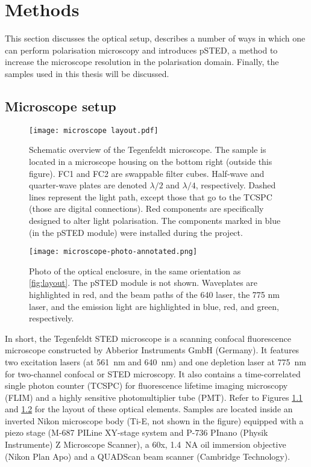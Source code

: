 \chapter{Methods}

This section discusses the optical setup, describes a number of ways in which one can perform polarisation microscopy and introduces pSTED, a method to increase the microscope resolution in the polarisation domain. Finally, the samples used in this thesis will be discussed.

\section{Microscope setup}

\begin{figure}[h!]
	\centering
	\texttt{[image: microscope layout.pdf]}
	\caption{
		Schematic overview of the Tegenfeldt microscope. The sample is located in a microscope housing on the bottom right (outside this figure). FC1 and FC2 are swappable filter cubes. Half-wave and quarter-wave plates are denoted $ \lambda/2 $ and $ \lambda/4 $, respectively. Dashed lines represent the light path, except those that go to the TCSPC (those are digital connections). Red components are specifically designed to alter light polarisation. The components marked in blue (in the pSTED module) were installed during the project.
	}
	\label{fig:layout}
\end{figure}

\begin{figure}
	\centering
	\texttt{[image: microscope-photo-annotated.png]}
	\caption{
		Photo of the optical enclosure, in the same orientation as \autoref{fig:layout}. The pSTED module is not shown. Waveplates are highlighted in red, and the beam paths of the 640 laser, the 775 nm laser, and the emission light are highlighted in blue, red, and green, respectively.
	}
	\label{fig:microscope photo}
\end{figure}

In short, the Tegenfeldt STED microscope is a scanning confocal fluorescence microscope constructed by Abberior Instruments GmbH (Germany). It features two excitation lasers (at 561~nm and 640~nm) and one depletion laser at 775~nm for two-channel confocal or STED microscopy. It also contains a time-correlated single photon counter (TCSPC) for fluorescence lifetime imaging microscopy (FLIM) and a highly sensitive photomultiplier tube (PMT). Refer to Figures \ref{fig:layout} and \ref{fig:microscope photo} for the layout of these optical elements. Samples are located inside an inverted Nikon microscope body (Ti-E, not shown in the figure) equipped with a piezo stage (M-687 PILine XY-stage system and P-736 PInano (Physik Instrumente) Z Microscope Scanner), a 60x, 1.4~NA oil immersion objective (Nikon Plan Apo) and a QUADScan beam scanner (Cambridge Technology).

